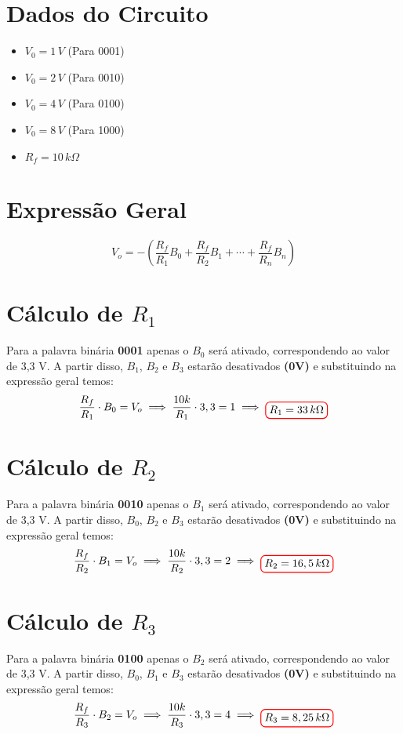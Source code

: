 \documentclass[12pt,openany,oneside,a4paper]{abntex2}
\begin{document}
\section{Dados do Circuito}
\begin{itemize}
    \item $V_{0} = 1\,V$ (Para 0001)
    \item $V_{0} = 2\,V$ (Para 0010)
    \item $V_{0} = 4\,V$ (Para 0100)
    \item $V_{0} = 8\,V$ (Para 1000)
    \item $R_{f} = 10\,{k}\Omega$
\end{itemize}

\section{Expressão Geral}
\[
V_{o} = - \left( \frac{R_{f}}{R_{1}} B_{0} + \frac{R_{f}}{R_{2}} B_{1} + \cdots + \frac{R_{f}}{R_{n}} B_{n} \right)
\]

\section{Cálculo de $R_1$}
Para a palavra binária \textbf{0001} apenas o $B_{0}$ será ativado, correspondendo ao valor de 3{,}3 V. A partir disso, $B_{1}$, $B_{2}$ e $B_{3}$ estarão desativados \textbf{(0V)} e substituindo na expressão geral temos: 
\\
\[
\frac{R_{f}}{R_{1}} \cdot B_{0} = V_{o} \implies \frac{10k}{R_{1}} \cdot 3,3 = 1 \implies \tikz[baseline]{\node[draw=red, thick, rounded corners] {$R_{1} = 33 \text\,{k}\Omega$};}
\]

\section{Cálculo de $R_2$}
Para a palavra binária \textbf{0010} apenas o $B_{1}$ será ativado, correspondendo ao valor de 3{,}3 V. A partir disso, $B_{0}$, $B_{2}$ e $B_{3}$ estarão desativados \textbf{(0V)} e substituindo na expressão geral temos:
\\
\[
\frac{R_{f}}{R_{2}} \cdot B_{1} = V_{o} \implies \frac{10k}{R_{2}} \cdot 3,3 = 2 \implies \tikz[baseline]{\node[draw=red, thick, rounded corners] {$R_{2} = 16,5 \text\,{k}\Omega$};}
\]

\section{Cálculo de $R_3$}
Para a palavra binária \textbf{0100} apenas o $B_{2}$ será ativado, correspondendo ao valor de 3{,}3 V. A partir disso, $B_{0}$, $B_{1}$ e $B_{3}$ estarão desativados \textbf{(0V)} e substituindo na expressão geral temos:
\\
\[
\frac{R_{f}}{R_{3}} \cdot B_{2} = V_{o} \implies \frac{10k}{R_{3}} \cdot 3,3 = 4 \implies \tikz[baseline]{\node[draw=red, thick, rounded corners] {$R_{3} = 8,25 \text\,{k}\Omega$};}
\]
\end{document}
